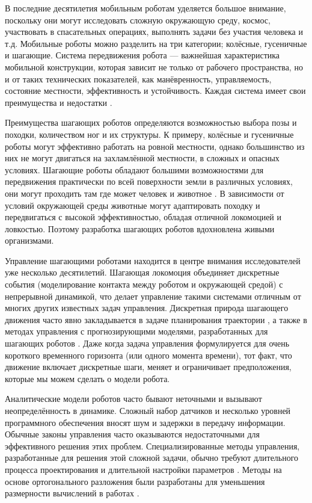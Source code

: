 {\actuality} 

В последние десятилетия мобильным роботам уделяется большое внимание, поскольку они могут исследовать сложную окружающую среду, космос, участвовать в спасательных операциях, выполнять задачи без участия человека и т.д. Мобильные роботы можно разделить на три категории; колёсные, гусеничные и шагающие. Система передвижения робота --- важнейшая характеристика мобильной конструкции, которая зависит не только от рабочего пространства, но и от таких технических показателей, как манёвренность, управляемость, состояние местности, эффективность и устойчивость. Каждая система имеет свои преимущества и недостатки \cite{zhong2019}.

Преимущества шагающих роботов определяются возможностью выбора позы и походки, количеством ног и их структуры. К примеру, колёсные и гусеничные роботы могут эффективно работать на ровной местности, однако большинство из них не могут двигаться на захламлённой местности, в сложных и опасных условиях. Шагающие роботы обладают большими возможностями для передвижения практически по всей поверхности земли в различных условиях, они могут проходить там где может человек и животное \cite{Silva2012}. В зависимости от условий окружающей среды животные могут адаптировать походку и передвигаться с высокой эффективностью, обладая отличной локомоцией и ловкостью. Поэтому разработка шагающих роботов вдохновлена живыми организмами.

Управление шагающими роботами находится в центре внимания исследователей уже несколько десятилетий. Шагающая локомоция объединяет дискретные события (моделирование контакта между роботом и окружающей средой) с непрерывной динамикой, что делает управление такими системами отличным от многих других известных задач управления. Дискретная природа шагающего движения часто явно закладывается в задаче планирования траектории \cite{katayama2022whole, lu2023whole}, а также в методах управления с прогнозирующими моделями, разработанных для шагающих роботов \cite{KIM2019, chignoli2021humanoid}. Даже когда задача управления формулируется для очень короткого временного горизонта (или одного момента времени), тот факт, что движение включает дискретные шаги, меняет и ограничивает предположения, которые мы можем сделать о модели робота.

Аналитические модели роботов часто бывают неточными и вызывают неопределённость в динамике. Сложный набор датчиков и несколько уровней программного обеспечения вносят шум и задержки в передачу информации. Обычные законы управления часто оказываются недостаточными для эффективного решения этих проблем. Специализированные методы управления, разработанные для решения этой сложной задачи, обычно требуют длительного процесса проектирования и длительной настройки параметров \cite{underactuated}. Методы на основе ортогонального разложения были разработаны для уменьшения размерности вычислений в работах \cite{Schur, mason2014full}.

